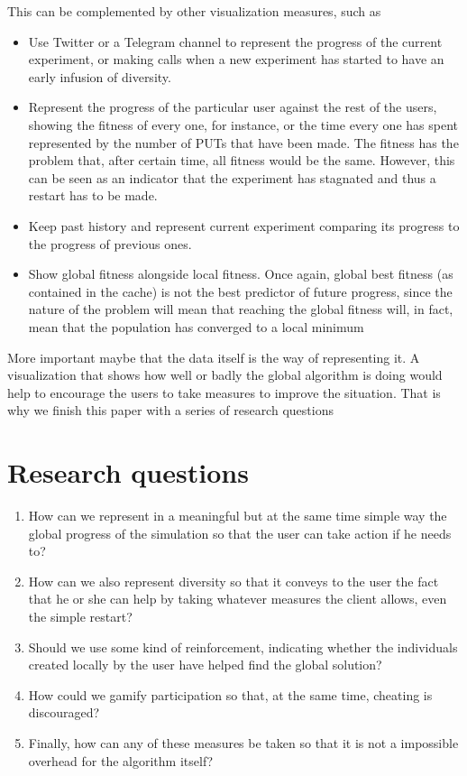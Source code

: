 \documentclass{sig-alternate}
\begin{document}
This can be complemented by other visualization measures, such as \begin{itemize}
\item Use Twitter or a Telegram channel to represent the progress of
  the current experiment, or making calls when a new experiment has
  started to have an early infusion of diversity.
\item Represent the progress of the particular user against the rest
  of the users, showing the fitness of every one, for instance, or the
  time every one has spent represented by the number of PUTs that have
  been made. The fitness has the problem that, after certain time, all
  fitness would be the same. However, this can be seen as an indicator
  that the experiment has stagnated and thus a restart has to be made.
\item Keep past history and represent current experiment comparing its
  progress to the progress of previous ones.
\item Show global fitness alongside local fitness. Once again, global
  best fitness (as contained in the cache) is not the best predictor
  of future progress, since the nature of the problem will mean that
  reaching the global fitness will, in fact, mean that the population
  has converged to a local minimum
\end{itemize}

More important maybe that the data itself is the way of representing
it. A visualization that shows how well or badly the global algorithm
is doing would help to encourage the users to take measures to improve
the situation. That is why we finish this paper with a series of
research questions

\section{Research questions}

\begin{enumerate}
\item How can we represent in a meaningful but at the same time simple
  way the global progress of the simulation so that the user can take
  action if he needs to?
\item How can we also represent diversity so that it conveys to the
  user the fact that he or she can help by taking whatever measures
  the client allows, even the simple restart?
\item Should we use some kind of reinforcement, indicating whether the
  individuals created locally by the user have helped find the global solution?
\item How could we gamify participation so that, at the same time,
  cheating is discouraged?
\item Finally, how can any of these measures be taken so that it is
  not a impossible overhead for the algorithm itself?
\end{enumerate}
\end{document}
